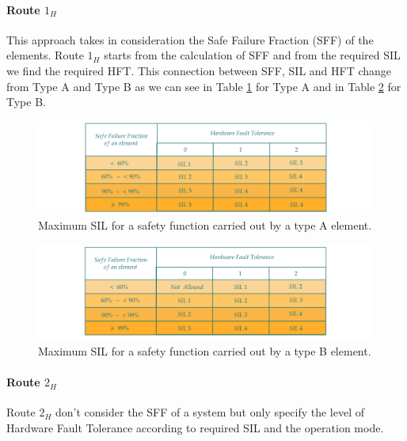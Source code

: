 {{{{		        \paragraph{Route $1_H$}{
		            This approach takes in consideration the Safe Failure Fraction (SFF) of the elements. Route $1_H$ starts from the calculation of SFF and from the required SIL we find the required HFT. This connection between SFF, SIL and HFT change from Type A and Type B as we can see in Table \ref{fig:TypeASIL} for Type A and in Table  \ref{fig:TypeBSIL} for Type B.
		            \begin{figure}[H]
        				\centering
        				\includegraphics[scale=0.2,center]{./images/TypeASILTable.png}
        				\caption{Maximum SIL for a safety function carried out by a type A element.}
    			    	\label{fig:TypeASIL}
    			    \end{figure} 
		            \begin{figure}[H]
        				\centering
        				\includegraphics[scale=0.2,center]{./images/TypeBSILTable.png}
        				\caption{Maximum SIL for a safety function carried out by a type B element.}
    			    	\label{fig:TypeBSIL}
    			    \end{figure} 
    			    
		        }
		        \paragraph{Route $2_H$}{
		               Route $2_H$ don't consider the SFF of a system but only specify the level of Hardware Fault Tolerance according to required SIL and the operation mode.
		        }
		        
		    }
		    
}}}

